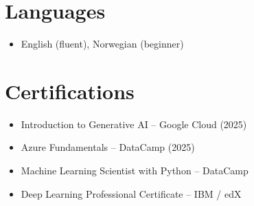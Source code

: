 \documentclass[11pt,a4paper,sans]{moderncv}
\begin{document}
%
%
%


\section{Languages}
\vspace{1pt}
\begin{itemize}
\item English (fluent), Norwegian (beginner)
\end{itemize}


\section{Certifications}
\vspace{1pt}
\begin{itemize}
\item Introduction to Generative AI -- Google Cloud (2025)
\item Azure Fundamentals -- DataCamp (2025)
\item Machine Learning Scientist with Python -- DataCamp
\item Deep Learning Professional Certificate -- IBM / edX
\end{itemize}
\end{document}
